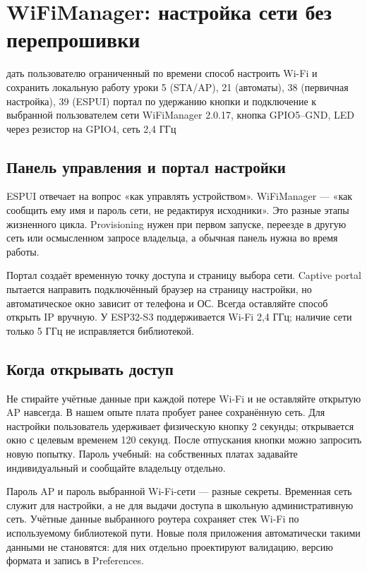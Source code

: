 \section{WiFiManager: настройка сети без перепрошивки}\label{les:wifimanager}
\lessonintro
  {дать пользователю ограниченный по времени способ настроить Wi-Fi и сохранить локальную работу}
  {уроки 5 (STA/AP), 21 (автоматы), 38 (первичная настройка), 39 (ESPUI)}
  {портал по удержанию кнопки и подключение к выбранной пользователем сети}
  {WiFiManager 2.0.17, кнопка GPIO5--GND, LED через резистор на GPIO4, сеть 2,4 ГГц}

\subsection{Панель управления и портал настройки}

ESPUI отвечает на вопрос «как управлять устройством». WiFiManager --- «как сообщить ему
имя и пароль сети, не редактируя исходники». Это разные этапы жизненного цикла.
Provisioning нужен при первом запуске, переезде в другую сеть или осмысленном запросе владельца,
а обычная панель нужна во время работы.

Портал создаёт временную точку доступа и страницу выбора сети. Captive portal пытается
направить подключённый браузер на страницу настройки, но автоматическое окно зависит от
телефона и ОС. Всегда оставляйте способ открыть IP вручную.
У ESP32-S3 поддерживается Wi-Fi 2,4 ГГц; наличие сети только 5 ГГц не исправляется библиотекой.

\subsection{Когда открывать доступ}

Не стирайте учётные данные при каждой потере Wi-Fi и не оставляйте открытую AP навсегда.
В нашем опыте плата пробует ранее сохранённую сеть. Для настройки пользователь удерживает
физическую кнопку 2 секунды; открывается окно с целевым временем 120 секунд.
После отпускания кнопки можно запросить новую попытку. Пароль  учебный:
на собственных платах задавайте индивидуальный и сообщайте владельцу отдельно.

Пароль AP и пароль выбранной Wi-Fi-сети --- разные секреты. Временная сеть
 служит для настройки, а не для выдачи доступа в школьную административную сеть.
Учётные данные выбранного роутера сохраняет стек Wi-Fi по используемому библиотекой пути.
Новые поля приложения автоматически такими данными не становятся: для них отдельно
проектируют валидацию, версию формата и запись в Preferences.

